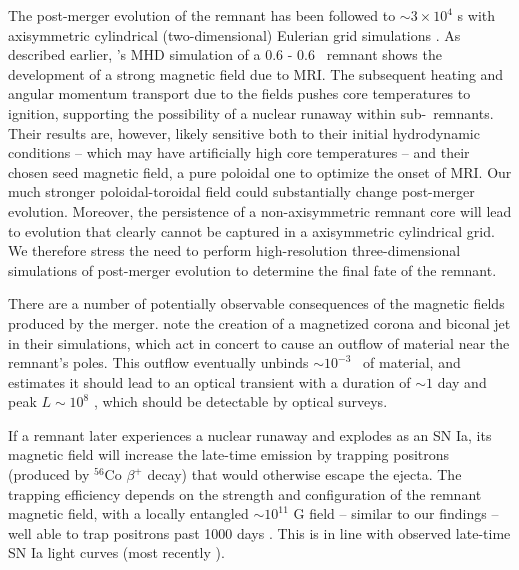 The post-merger evolution of the remnant has been followed to $\sim3\times10^4$ s with axisymmetric cylindrical (two-dimensional) Eulerian grid simulations \citep{schw+12,ji+13}.  As described earlier, \cite{ji+13}'s MHD simulation of a 0.6 - 0.6 \Msun\ remnant shows the development of a strong magnetic field due to MRI.  The subsequent heating and angular momentum transport due to the fields pushes core temperatures to ignition, supporting the possibility of a nuclear runaway within sub-\Mch\ remnants.  Their results are, however, likely sensitive both to their initial hydrodynamic conditions -- which may have artificially high core temperatures -- and their chosen seed magnetic field, a pure poloidal one to optimize the onset of MRI.  Our much stronger poloidal-toroidal field could substantially change post-merger evolution.  Moreover, the persistence of a non-axisymmetric remnant core will lead to evolution that clearly cannot be captured in a axisymmetric cylindrical grid.  We therefore stress the need to perform high-resolution three-dimensional simulations of post-merger evolution to determine the final fate of the remnant.


There are a number of potentially observable consequences of the magnetic fields produced by the merger.  \cite{ji+13} note the creation of a magnetized corona and biconal jet in their simulations, which act in concert to cause an outflow of material near the remnant's poles.  This outflow eventually unbinds $\sim10^{-3}$ \Msun\ of material, and \cite{belo14} estimates it should lead to an optical transient with a duration of $\sim1$ day and peak $L \sim10^{8}$ \Lsun, which should be detectable by optical surveys.

If a remnant later experiences a nuclear runaway and explodes as an SN Ia, its magnetic field will increase the late-time emission by trapping positrons (produced by $^{56}$Co $\beta^+$ decay) that would otherwise escape the ejecta.  The trapping efficiency depends on the strength and configuration of the remnant magnetic field, with a locally entangled $\sim10^{11}$ G field -- similar to our findings -- well able to trap positrons past 1000 days \citep{ruizs98}.  This is in line with observed late-time SN Ia light curves (most recently \citealt{kerz+14}).

